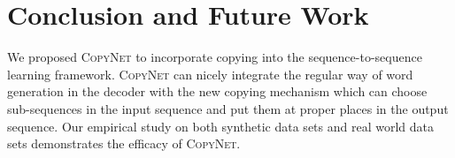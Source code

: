 \section{Conclusion and Future Work}
We proposed \textsc{CopyNet} to incorporate copying into the sequence-to-sequence learning framework.  \textsc{CopyNet} can nicely integrate the regular way of word generation in the decoder with the new copying mechanism which can choose sub-sequences in the input sequence and put them at proper places in the output sequence. Our empirical study on both synthetic data sets and real world data sets demonstrates the efficacy of \textsc{CopyNet}. 